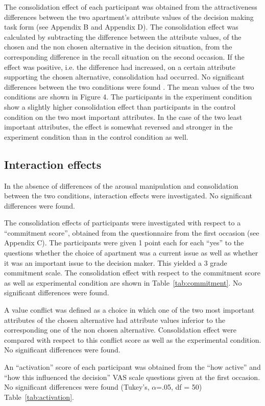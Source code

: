 \documentclass[jou,draftfirst,11pt]{apa6}
\newcommand{\tabell}[1]{Table~\ref{#1}}
\begin{document}
The consolidation effect of each participant was obtained from the
attractiveness differences between the two apartment's attribute
values of the decision making task form (see Appendix B and Appendix
D).  The consolidation effect was calculated by subtracting the
difference between the attribute values, of the chosen and the non
chosen alternative in the decision situation, from the corresponding
difference in the recall situation on the second occasion.  If the
effect was positive, i.e. the difference had increased, on a certain
attribute supporting the chosen alternative, consolidation had
occurred.  No significant differences between the two conditions were
found . The mean values of the two conditions are shown in Figure 4.
The participants in the experiment condition show a slightly higher
consolidation effect than participants in the control condition on the
two most important attributes.  In the case of the two least important
attributes, the effect is somewhat reversed and stronger in the
experiment condition than in the control condition as well.


\subsection{Interaction effects}

In the absence of differences of the arousal manipulation and
consolidation between the two conditions, interaction effects were
investigated. No significant differences were found.

The consolidation effects of participants were investigated with
respect to a ``commitment score'', obtained from the questionnaire from
the first occasion (see Appendix C). The participants were given 1
point each for each ``yes'' to the questions whether the choice of
apartment was a current issue as well as whether it was an important
issue to the decision maker. This yielded a 3 grade commitment scale.
The consolidation effect with respect to the commitment score as well
as experimental condition are shown in \tabell{tab:commitment}. No
significant differences were found.


A value conflict was defined as a choice in which one of the two most
important attributes of the chosen alternative had attribute values
inferior to the corresponding one of the non chosen
alternative. Consolidation effect were compared with respect to this
conflict score as well as the experimental condition. No significant
differences were found.

An ``activation'' score of each participant was obtained from the ``how
active'' and ``how this influenced the decision'' VAS scale questions
given at the first occasion.   No significant differences were found
(Tukey's, $\alpha$=.05, df = 50) \tabell{tab:activation}.
\end{document}
